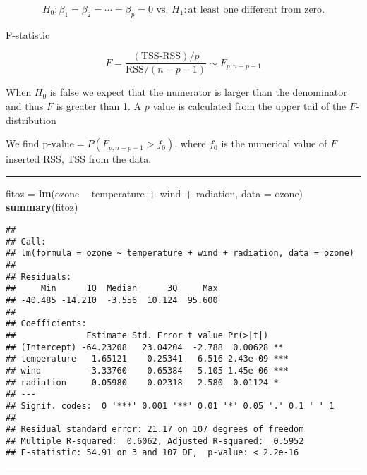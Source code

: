 \documentclass[]{article}
\newenvironment{Shaded}{\begin{snugshade}}{\end{snugshade}}
\newcommand{\DataTypeTok}[1]{\textcolor[rgb]{0.13,0.29,0.53}{#1}}
\newcommand{\KeywordTok}[1]{\textcolor[rgb]{0.13,0.29,0.53}{\textbf{#1}}}
\newcommand{\NormalTok}[1]{#1}
\newcommand{\OperatorTok}[1]{\textcolor[rgb]{0.81,0.36,0.00}{\textbf{#1}}}
\newcommand{\StringTok}[1]{\textcolor[rgb]{0.31,0.60,0.02}{#1}}
\begin{document}
\[ H_0: \beta_1=\beta_2=\cdots= \beta_p =0 \text{ vs. } H_1: \text{at least one different from zero}.\]

F-statistic

\[F=\frac{(\text{TSS-RSS})/p}{\text{RSS}/(n-p-1)} \sim F_{p,n-p-1}\]

When \(H_0\) is false we expect that the numerator is larger than the
denominator and thus \(F\) is greater than 1. A \(p\) value is
calculated from the upper tail of the \(F\)-distribution

We find \(\text{p-value}=P(F_{p,n-p-1}>f_0)\), where \(f_0\) is the
numerical value of \(F\) inserted RSS, TSS from the data.

\begin{center}\rule{0.5\linewidth}{\linethickness}\end{center}

\footnotesize

\begin{Shaded}
\begin{Highlighting}[]
\NormalTok{fitoz =}\StringTok{ }\KeywordTok{lm}\NormalTok{(ozone }\OperatorTok{~}\StringTok{ }\NormalTok{temperature }\OperatorTok{+}\StringTok{ }\NormalTok{wind }\OperatorTok{+}\StringTok{ }\NormalTok{radiation, }\DataTypeTok{data =}\NormalTok{ ozone)}
\KeywordTok{summary}\NormalTok{(fitoz)}
\end{Highlighting}
\end{Shaded}

\begin{verbatim}
## 
## Call:
## lm(formula = ozone ~ temperature + wind + radiation, data = ozone)
## 
## Residuals:
##     Min      1Q  Median      3Q     Max 
## -40.485 -14.210  -3.556  10.124  95.600 
## 
## Coefficients:
##              Estimate Std. Error t value Pr(>|t|)    
## (Intercept) -64.23208   23.04204  -2.788  0.00628 ** 
## temperature   1.65121    0.25341   6.516 2.43e-09 ***
## wind         -3.33760    0.65384  -5.105 1.45e-06 ***
## radiation     0.05980    0.02318   2.580  0.01124 *  
## ---
## Signif. codes:  0 '***' 0.001 '**' 0.01 '*' 0.05 '.' 0.1 ' ' 1
## 
## Residual standard error: 21.17 on 107 degrees of freedom
## Multiple R-squared:  0.6062, Adjusted R-squared:  0.5952 
## F-statistic: 54.91 on 3 and 107 DF,  p-value: < 2.2e-16
\end{verbatim}

\normalsize

\begin{center}\rule{0.5\linewidth}{\linethickness}\end{center}
\end{document}
